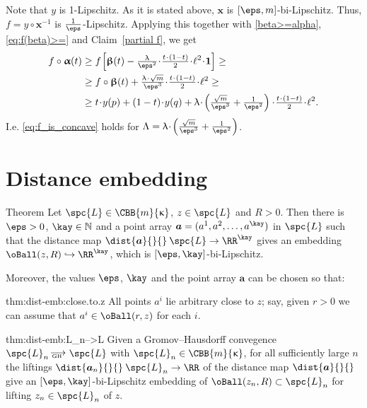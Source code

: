 Note that $y$ is 1-Lipschitz.
As it is stated above, 
$\bm{x}$ is $[\eps,m]$-bi-Lipschitz.
Thus, $f=y\circ\bm{x}^{-1}$ is $\tfrac1\eps$-Lipschitz.
Applying this 
together with \ref{beta>=alpha}, 
\ref{eq:f(beta)>=}
and Claim~\ref{partial f},
we get 
\begin{align*}
f\circ\bm{\alpha}(t)
&\ge 
f
\l[
\bm{\beta}(t)
-
\tfrac\lambda{\eps^2}\cdot\tfrac{t\cdot(1-t)}2\cdot\ell^2\cdot\bm{1}
\r]
\ge
\\
&
\ge
f\circ\bm{\beta}(t)
+
\tfrac{\lambda
\cdot 
\sqrt{m}}{\eps^3}
\cdot
\tfrac{t\cdot(1-t)}2
\cdot
\ell^2
\ge
\\
&
\ge
t\cdot y(p)
+(1-t)\cdot y(q)+
\lambda\cdot\l(\tfrac{\sqrt{m}}{\eps^3}+\tfrac1{\eps^2}\r)
\cdot 
\tfrac{t\cdot(1-t)}2
\cdot
\ell^2.
\end{align*}
I.e. \ref{eq:f_is_concave} holds for $\Lambda=\lambda\cdot\l(\tfrac{\sqrt{m}}{\eps^3}+\tfrac1{\eps^2}\r)$.
\qeds

\section{Distance embedding}\label{sec:dist-embedding}


\begin{thm}{Theorem}\label{thm:dist-emb}
Let $\spc{L}\in\CBB{m}{\kappa}$, $z\in\spc{L}$ and $R>0$.
Then there is $\eps>0$, 
$\kay\in\NN$ 
and a point array $\bm{a}=(a^1,a^2,\dots,a^\kay)$ in $\spc{L}$
such that the distance map $\dist{\bm{a}}{}{}\:\spc{L}\to\RR^\kay$ gives an embedding $\oBall(z,R)\hookrightarrow\RR^\kay$, 
which is $[\eps,\kay]$-bi-Lipschitz.

Moreover, the values $\eps$, $\kay$ and the point array $\bm{a}$ can be chosen so that:

\begin{subthm}{thm:dist-emb:close.to.z}
All points $a^i$ lie arbitrary close to $z$;
say, given $r>0$ we can assume that $a^i\in\oBall(r,z)$ for each $i$.
\end{subthm}

\begin{subthm}{thm:dist-emb:L_n-->L}
Given a Gromov--Hausdorff convegence
$\spc{L}_n\GHto\spc{L}$ with $\spc{L}_n\in\CBB{m}{\kappa}$,
for all sufficiently large $n$
the liftings $\dist{\bm{a}_n}{}{}\:\spc{L}_n\to\RR$ of the distance map $\dist{\bm{a}}{}{}$ 
give an $[\eps,\kay]$-bi-Lipschitz embedding of $\oBall(z_n,R)\subset \spc{L}_n$ for lifting $z_n\in\spc{L}_n$ of $z$.
\end{subthm}
\end{thm}

